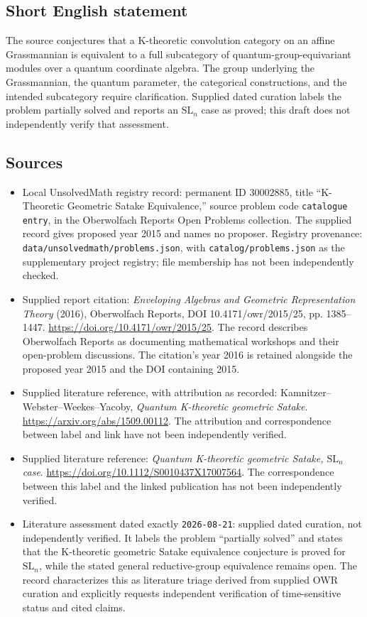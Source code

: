 \documentclass[11pt]{article}
\begin{document}
\subsection{Short English statement}
The source conjectures that a K-theoretic convolution category on an affine Grassmannian is equivalent to a full subcategory of quantum-group-equivariant modules over a quantum coordinate algebra. The group underlying the Grassmannian, the quantum parameter, the categorical constructions, and the intended subcategory require clarification. Supplied dated curation labels the problem partially solved and reports an \(\mathrm{SL}_n\) case as proved; this draft does not independently verify that assessment.
\subsection{Sources}
\begin{itemize}
\item Local UnsolvedMath registry record: permanent ID \(30002885\), title ``K-Theoretic Geometric Satake Equivalence,'' source problem code \texttt{catalogue entry}, in the Oberwolfach Reports Open Problems collection. The supplied record gives proposed year 2015 and names no proposer. Registry provenance: \texttt{data/unsolvedmath/problems.json}, with \texttt{catalog/problems.json} as the supplementary project registry; file membership has not been independently checked.
\item Supplied report citation: \emph{Enveloping Algebras and Geometric Representation Theory} (2016), Oberwolfach Reports, DOI 10.4171/owr/2015/25, pp. 1385--1447. \url{https://doi.org/10.4171/owr/2015/25}. The record describes Oberwolfach Reports as documenting mathematical workshops and their open-problem discussions. The citation's year 2016 is retained alongside the proposed year 2015 and the DOI containing 2015.
\item Supplied literature reference, with attribution as recorded: Kamnitzer--Webster--Weekes--Yacoby, \emph{Quantum K-theoretic geometric Satake}. \url{https://arxiv.org/abs/1509.00112}. The attribution and correspondence between label and link have not been independently verified.
\item Supplied literature reference: \emph{Quantum K-theoretic geometric Satake, \(\mathrm{SL}_n\) case}. \url{https://doi.org/10.1112/S0010437X17007564}. The correspondence between this label and the linked publication has not been independently verified.
\item Literature assessment dated exactly \texttt{2026-08-21}: supplied dated curation, not independently verified. It labels the problem ``partially solved'' and states that the K-theoretic geometric Satake equivalence conjecture is proved for \(\mathrm{SL}_n\), while the stated general reductive-group equivalence remains open. The record characterizes this as literature triage derived from supplied OWR curation and explicitly requests independent verification of time-sensitive status and cited claims.
\end{itemize}
\end{document}

